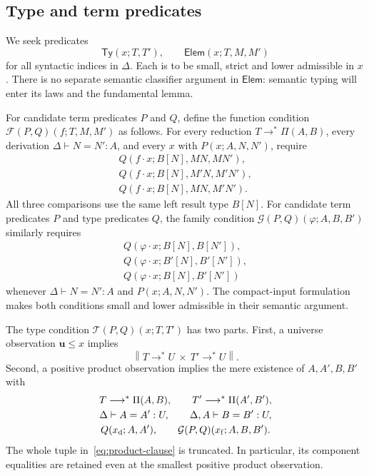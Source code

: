 \documentclass[11pt,a4paper]{article}
\theoremstyle{definition}
\theoremstyle{remark}
\newcommand{\TyRel}{\mathsf{Ty}}
\newcommand{\ElemRel}{\mathsf{Elem}}
\newcommand{\trunc}[1]{\left\lVert #1\right\rVert}
\newcommand{\appl}{\mathbin{\cdot}}
\begin{document}
\subsection{Type and term predicates}

We seek predicates
\[
 \TyRel(x;T,T'),\qquad \ElemRel(x;T,M,M')
\]
for all syntactic indices in $\Delta$. Each is to be small, strict and
lower admissible in $x$. There is no separate semantic classifier
argument in $\ElemRel$: semantic typing will enter its laws and the
fundamental lemma.

For candidate term predicates $P$ and $Q$, define the function condition
$\mathcal F(P,Q)(f;T,M,M')$ as follows. For every reduction
$T\longrightarrow^*\Pi(A,B)$, every derivation
$\Delta\vdash N=N':A$, and every $x$ with $P(x;A,N,N')$, require
\begin{equation}\label{eq:function-outputs}
\begin{aligned}
 Q(f\appl x;B[N],MN,MN'),\\
 Q(f\appl x;B[N],M'N,M'N'),\\
 Q(f\appl x;B[N],MN,M'N').
\end{aligned}
\end{equation}
All three comparisons use the same left result type $B[N]$.
For candidate term predicates $P$ and type predicates $Q$, the family
condition $\mathcal G(P,Q)(\varphi;A,B,B')$ similarly requires
\begin{equation}\label{eq:family-outputs}
\begin{aligned}
 Q(\varphi\appl x;B[N],B[N']),\\
 Q(\varphi\appl x;B'[N],B'[N']),\\
 Q(\varphi\appl x;B[N],B'[N'])
\end{aligned}
\end{equation}
whenever $\Delta\vdash N=N':A$ and $P(x;A,N,N')$.
The compact-input formulation makes both conditions small and lower
admissible in their semantic argument.

The type condition $\mathcal T(P,Q)(x;T,T')$ has two parts.
First, a universe observation $\mathbf u\leq x$ implies
\[
 \trunc{T\longrightarrow^*U\ \mathbin{\times}\ T'\longrightarrow^*U}.
\]
Second, a positive product observation implies the mere existence of
$A,A',B,B'$ with
\begin{equation}\label{eq:product-clause}
\begin{gathered}
 T\longrightarrow^*\Pi(A,B),\qquad
 T'\longrightarrow^*\Pi(A',B'),\\
 \Delta\vdash A=A':U,\qquad
 \Delta,A\vdash B=B':U,\\
 Q(x_{\rm d};A,A'),\qquad
 \mathcal G(P,Q)(x_{\rm f};A,B,B').
\end{gathered}
\end{equation}
The whole tuple in~\eqref{eq:product-clause} is truncated. In particular,
its component equalities are retained even at the smallest positive
product observation.
\end{document}
